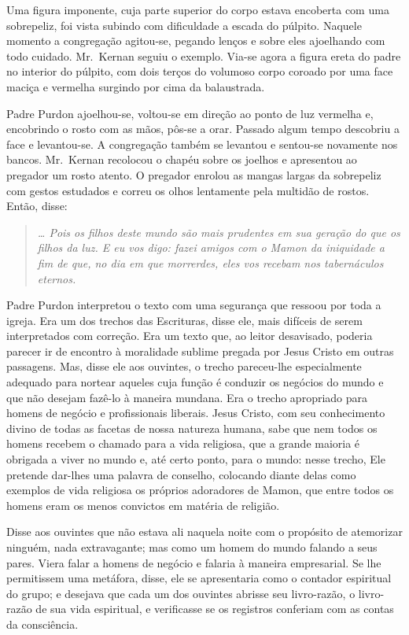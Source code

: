 Uma figura imponente, cuja parte superior do corpo estava encoberta com uma
sobrepeliz, foi vista subindo com dificuldade a escada do púlpito.  Naquele
momento a congregação agitou-se, pegando lenços e sobre eles ajoelhando com
todo cuidado.  Mr.~Kernan seguiu o exemplo.  Via-se agora a figura ereta do
padre no interior do púlpito, com dois terços do volumoso corpo coroado por uma
face maciça e vermelha surgindo por cima da balaustrada.

Padre Purdon ajoelhou-se, voltou-se em direção ao ponto de luz vermelha e,
encobrindo o rosto com as mãos, pôs-se a orar.  Passado algum tempo descobriu a
face e levantou-se.  A congregação também se levantou e sentou-se novamente nos
bancos.  Mr.~Kernan recolocou o chapéu sobre os joelhos e apresentou ao
pregador um rosto atento.  O pregador enrolou as mangas largas da sobrepeliz
com gestos estudados e correu os olhos lentamente pela multidão de rostos.
Então, disse:

\begin{quote}\itshape
\ldots{} Pois os filhos deste mundo são mais prudentes em sua
geração do que os filhos da luz.  E eu vos digo: fazei amigos com o
Mamon da iniquidade a fim de que, no dia em que morrerdes, eles vos
recebam nos tabernáculos eternos.
\end{quote}

Padre Purdon interpretou o texto com uma segurança que ressoou por toda a
igreja.  Era um dos trechos das Escrituras, disse ele, mais difíceis de serem
interpretados com correção.  Era um texto que, ao leitor desavisado, poderia
parecer ir de encontro à moralidade sublime pregada por Jesus Cristo em outras
passagens.  Mas, disse ele aos ouvintes, o trecho pareceu-lhe especialmente
adequado para nortear aqueles cuja função é conduzir os negócios do mundo e que
não desejam fazê-lo à maneira mundana.  Era o trecho apropriado para homens de
negócio e profissionais liberais.  Jesus Cristo, com seu conhecimento divino de
todas as facetas de nossa natureza humana, sabe que nem todos os homens recebem
o chamado para a vida religiosa, que a grande maioria é obrigada a viver no
mundo e, até certo ponto, para o mundo: nesse trecho, Ele pretende dar-lhes uma
palavra de conselho, colocando diante delas como exemplos de vida religiosa os
próprios adoradores de Mamon, que entre todos os homens eram os menos convictos
em matéria de religião.

Disse aos ouvintes que não estava ali naquela noite com o propósito de
atemorizar ninguém, nada extravagante; mas como um homem do mundo falando a
seus pares.  Viera falar a homens de negócio e falaria à maneira empresarial.
Se lhe permitissem uma metáfora, disse, ele se apresentaria como o contador
espiritual do grupo; e desejava que cada um dos ouvintes abrisse seu
livro-razão, o livro-razão de sua vida espiritual, e verificasse se os
registros conferiam com as contas da consciência.

